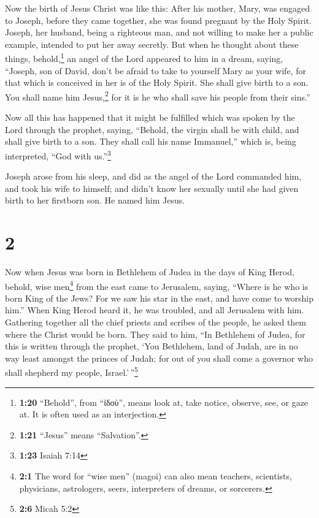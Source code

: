 Now the birth of Jesus Christ was like this: After his
mother, Mary, was engaged to Joseph, before they came together, she was
found pregnant by the Holy Spirit.  Joseph, her husband,
being a righteous man, and not willing to make her a public example,
intended to put her away secretly.  But when he thought
about these things, behold,\footnote{\textbf{1:20} ``Behold'', from
  ``ἰδοὺ'', means look at, take notice, observe, see, or gaze at. It is
  often used as an interjection.} an angel of the Lord appeared to him
in a dream, saying, ``Joseph, son of David, don't be afraid to take to
yourself Mary as your wife, for that which is conceived in her is of the
Holy Spirit.  She shall give birth to a son. You shall
name him Jesus,\footnote{\textbf{1:21} ``Jesus'' means ``Salvation''.}
for it is he who shall save his people from their sins.''

 Now all this has happened that it might be fulfilled
which was spoken by the Lord through the prophet, saying,
 ``Behold, the virgin shall be with child, and shall give
birth to a son. They shall call his name Immanuel,'' which is, being
interpreted, ``God with us.''\footnote{\textbf{1:23} Isaiah 7:14}

 Joseph arose from his sleep, and did as the angel of the
Lord commanded him, and took his wife to himself;  and
didn't know her sexually until she had given birth to her firstborn son.
He named him Jesus.

\hypertarget{section-1}{%
\section{2}\label{section-1}}

 Now when Jesus was born in Bethlehem of Judea in the days
of King Herod, behold, wise men\footnote{\textbf{2:1} The word for
  ``wise men'' (magoi) can also mean teachers, scientists, physicians,
  astrologers, seers, interpreters of dreams, or sorcerers.} from the
east came to Jerusalem, saying,  ``Where is he who is born
King of the Jews? For we saw his star in the east, and have come to
worship him.''  When King Herod heard it, he was troubled,
and all Jerusalem with him.  Gathering together all the
chief priests and scribes of the people, he asked them where the Christ
would be born.  They said to him, ``In Bethlehem of Judea,
for this is written through the prophet,  `You Bethlehem,
land of Judah, are in no way least amongst the princes of Judah; for out
of you shall come a governor who shall shepherd my people,
Israel.'\,''\footnote{\textbf{2:6} Micah 5:2}

